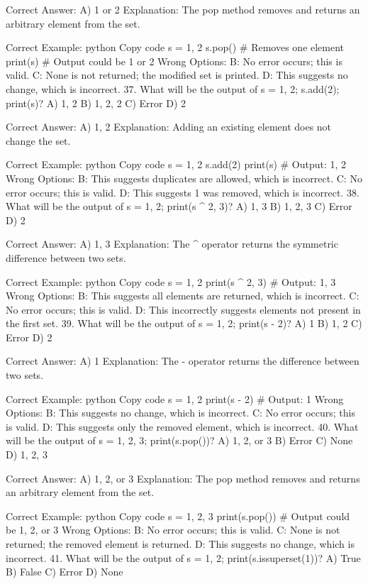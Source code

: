 Correct Answer: A) {1} or {2}
Explanation: The pop method removes and returns an arbitrary element from the set.

Correct Example:
python
Copy code
s = {1, 2}
s.pop()  # Removes one element
print(s)  # Output could be {1} or {2}
Wrong Options:
B: No error occurs; this is valid.
C: None is not returned; the modified set is printed.
D: This suggests no change, which is incorrect.
37. What will be the output of s = {1, 2}; s.add(2); print(s)?
A) {1, 2}
B) {1, 2, 2}
C) Error
D) {2}

Correct Answer: A) {1, 2}
Explanation: Adding an existing element does not change the set.

Correct Example:
python
Copy code
s = {1, 2}
s.add(2)
print(s)  # Output: {1, 2}
Wrong Options:
B: This suggests duplicates are allowed, which is incorrect.
C: No error occurs; this is valid.
D: This suggests 1 was removed, which is incorrect.
38. What will be the output of s = {1, 2}; print(s ^ {2, 3})?
A) {1, 3}
B) {1, 2, 3}
C) Error
D) {2}

Correct Answer: A) {1, 3}
Explanation: The ^ operator returns the symmetric difference between two sets.

Correct Example:
python
Copy code
s = {1, 2}
print(s ^ {2, 3})  # Output: {1, 3}
Wrong Options:
B: This suggests all elements are returned, which is incorrect.
C: No error occurs; this is valid.
D: This incorrectly suggests elements not present in the first set.
39. What will be the output of s = {1, 2}; print(s - {2})?
A) {1}
B) {1, 2}
C) Error
D) {2}

Correct Answer: A) {1}
Explanation: The - operator returns the difference between two sets.

Correct Example:
python
Copy code
s = {1, 2}
print(s - {2})  # Output: {1}
Wrong Options:
B: This suggests no change, which is incorrect.
C: No error occurs; this is valid.
D: This suggests only the removed element, which is incorrect.
40. What will be the output of s = {1, 2, 3}; print(s.pop())?
A) 1, 2, or 3
B) Error
C) None
D) {1, 2, 3}

Correct Answer: A) 1, 2, or 3
Explanation: The pop method removes and returns an arbitrary element from the set.

Correct Example:
python
Copy code
s = {1, 2, 3}
print(s.pop())  # Output could be 1, 2, or 3
Wrong Options:
B: No error occurs; this is valid.
C: None is not returned; the removed element is returned.
D: This suggests no change, which is incorrect.
41. What will be the output of s = {1, 2}; print(s.issuperset({1}))?
A) True
B) False
C) Error
D) None

